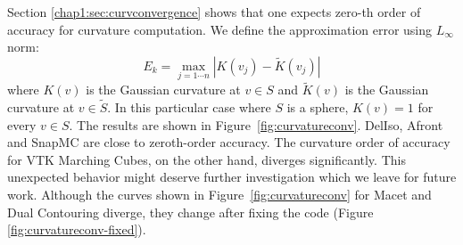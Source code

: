 Section \ref{chap1:sec:curvconvergence} shows that one expects zero-th order of accuracy for 
curvature computation. 
We define the approximation error using $L_\infty$ norm:
\begin{equation}
E_{k} = \max_{j=1\cdots n}|K(v_j) - \tilde{K}(v_j)|
\label{eq:curverror}
\end{equation}
where $K(v)$ is the Gaussian curvature at $v \in S$ and $\tilde{K}(v)$ is the Gaussian curvature at $v \in \tilde{S}$. In this
particular case where $S$ is a sphere, $K(v) = 1$ for every $v \in S$. The results 
are shown in Figure~\ref{fig:curvatureconv}.
DelIso, Afront and SnapMC are close to zeroth-order accuracy. The
curvature order of accuracy for VTK Marching Cubes, on the other hand,
diverges significantly. This unexpected behavior might deserve further
investigation which we leave for future work.
Although the curves shown in Figure~\ref{fig:curvatureconv} for Macet and 
Dual Contouring diverge, they change after fixing the code 
(Figure \ref{fig:curvatureconv-fixed}).

